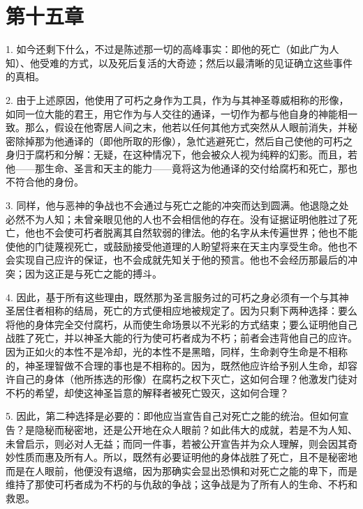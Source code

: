 \section{第十五章}

1. 如今还剩下什么，不过是陈述那一切的高峰事实：即他的死亡（如此广为人知）、他受难的方式，以及死后复活的大奇迹；然后以最清晰的见证确立这些事件的真相。\par

2. 由于上述原因，他使用了可朽之身作为工具，作为与其神圣尊威相称的形像，如同一位大能的君王，用它作为与人交往的通译，一切作为都与他自身的神能相一致。那么，假设在他寄居人间之末，他若以任何其他方式突然从人眼前消失，并秘密除掉那为他通译的（即他所取的形像），急忙逃避死亡，然后自己使他的可朽之身归于腐朽和分解：无疑，在这种情况下，他会被众人视为纯粹的幻影。而且，若他——那生命、圣言和天主的能力——竟将这为他通译的交付给腐朽和死亡，那也不符合他的身份。\par

3. 同样，他与恶神的争战也不会通过与死亡之能的冲突而达到圆满。他退隐之处必然不为人知；未曾亲眼见他的人也不会相信他的存在。没有证据证明他胜过了死亡，他也不会使可朽者脱离其自然软弱的律法。他的名字从未传遍世界；他也不能使他的门徒蔑视死亡，或鼓励接受他道理的人盼望将来在天主内享受生命。他也不会实现自己应许的保证，也不会成就先知关于他的预言。他也不会经历那最后的冲突；因为这正是与死亡之能的搏斗。\par

4. 因此，基于所有这些理由，既然那为圣言服务过的可朽之身必须有一个与其神圣居住者相称的结局，死亡的方式便相应地被规定了。因为只剩下两种选择：要么将他的身体完全交付腐朽，从而使生命场景以不光彩的方式结束；要么证明他自己战胜了死亡，并以神圣大能的行为使可朽者成为不朽；前者会违背他自己的应许。因为正如火的本性不是冷却，光的本性不是黑暗，同样，生命剥夺生命是不相称的，神圣理智做不合理的事也是不相称的。因为，既然他应许给予别人生命，却容许自己的身体（他所拣选的形像）在腐朽之权下灭亡，这如何合理？他激发门徒对不朽的希望，却使这神圣旨意的解释者被死亡毁灭，这如何合理？\par

5. 因此，第二种选择是必要的：即他应当宣告自己对死亡之能的统治。但如何宣告？是隐秘而秘密地，还是公开地在众人眼前？如此伟大的成就，若是不为人知、未曾启示，则必对人无益；而同一件事，若被公开宣告并为众人理解，则会因其奇妙性质而惠及所有人。所以，既然有必要证明他的身体战胜了死亡，且不是秘密地而是在人眼前，他便没有退缩，因为那确实会显出恐惧和对死亡之能的卑下，而是维持了那使可朽者成为不朽的与仇敌的争战；这争战是为了所有人的生命、不朽和救恩。\par

